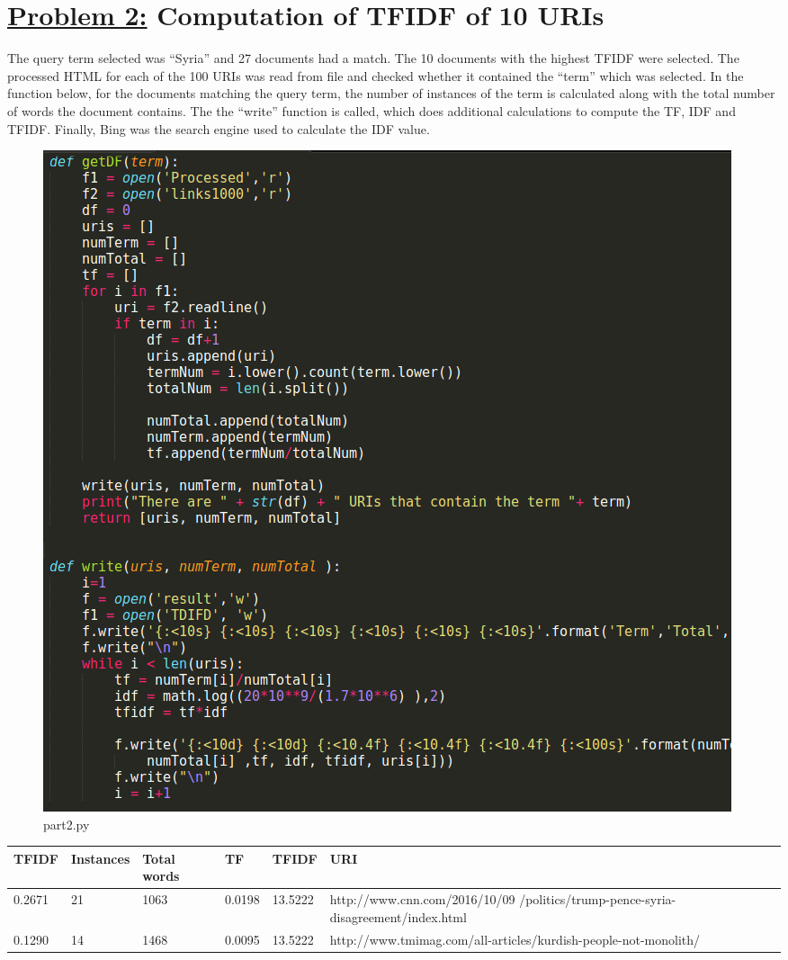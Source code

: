 \documentclass{article}
\begin{document}
{%

\section*{{\underline{\huge {Problem 2:}} Computation of TFIDF of 10 URIs}}
The query term selected was ``Syria'' and 27 documents had a match. The 10 documents with the highest TFIDF were selected. The processed HTML for each of the 100 URIs was read from file and checked whether it contained the ``term'' which was selected. In the function below, for the documents matching the query term, the number of instances of the term is calculated along with the total number of words the document contains. The the ``write''  function is called, which does additional calculations to compute the TF, IDF and TFIDF. Finally, Bing was the search engine used to calculate the IDF value. \\ 

\begin{figure}[H]
 \centering
 	\includegraphics[width = 17 cm]{p2.png}
  \caption{part2.py}
\end{figure}

\begin{tabular}{ |p{2cm}||p{2cm}|p{2cm}|p{2cm}| p{2cm}|p{6cm}| }
 \hline
 TFIDF& Instances &Total words & TF & TFIDF & URI \\
 \hline
 0.2671   & 21    &1063    &0.0198	&  13.5222 &  {http://www.cnn.com/2016/10/09 /politics/trump-pence-syria-disagreement/index.html}    \\
\hline
 0.1290   & 14    & 1468   &0.0095	& 13.5222 &   { http://www.tmimag.com/all-articles/kurdish-people-not-monolith/ }	\\
\hline


\end{tabular}}
\end{document}
